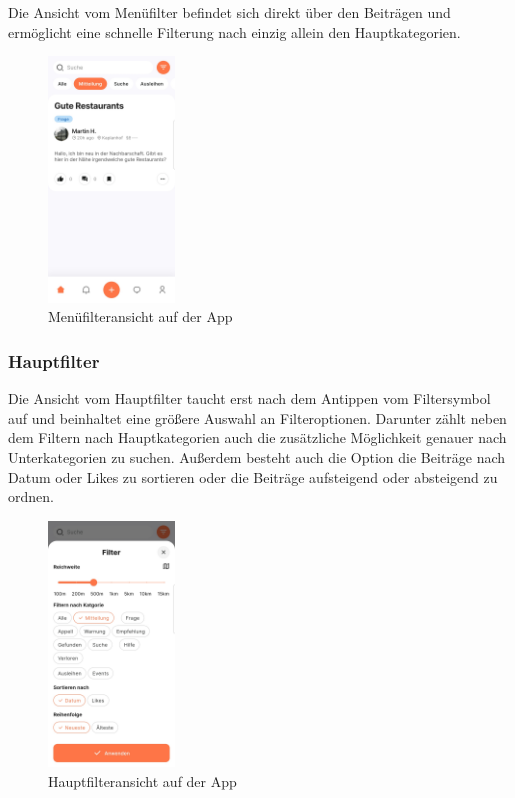Die Ansicht vom Menüfilter befindet sich direkt über den Beiträgen und ermöglicht eine schnelle Filterung nach einzig allein den Hauptkategorien.

\begin{figure}[h]
  \centering
  \includegraphics[width=0.3\textwidth]{pics/menu-filter.jpg}
  \caption{Menüfilteransicht auf der App}
\end{figure}

\subsubsection{Hauptfilter}

Die Ansicht vom Hauptfilter taucht erst nach dem Antippen vom Filtersymbol auf und beinhaltet eine größere Auswahl an Filteroptionen. Darunter zählt neben dem Filtern nach Hauptkategorien auch die zusätzliche Möglichkeit genauer nach Unterkategorien zu suchen. Außerdem besteht auch die Option die Beiträge nach Datum oder Likes zu sortieren oder die Beiträge aufsteigend oder absteigend zu ordnen.

\begin{figure}[h]
  \centering
  \includegraphics[width=0.3\textwidth]{pics/main-filter.jpg}
  \caption{Hauptfilteransicht auf der App}
\end{figure}


